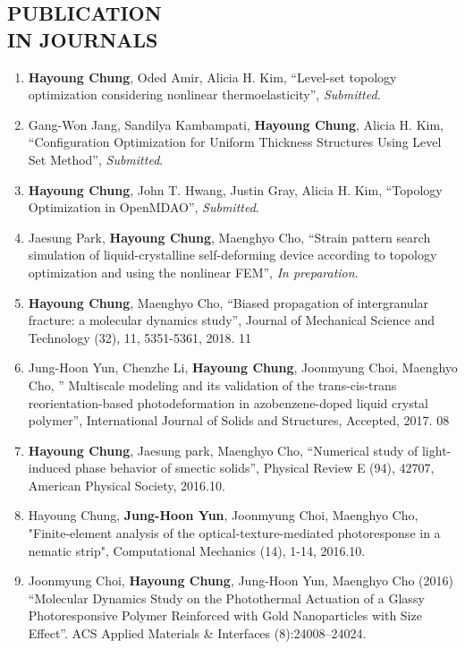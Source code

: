 \documentclass[margin, 10pt]{res} %
\begin{document}
\begin{resume}
\section{PUBLICATION \\ IN JOURNALS}

\begin{enumerate}
    \item \textbf{Hayoung Chung}, Oded Amir, Alicia H. Kim, “Level-set topology optimization considering nonlinear thermoelasticity”, \textit{Submitted}. %
    \item Gang-Won Jang, Sandilya Kambampati, \textbf{Hayoung Chung}, Alicia H. Kim, “Configuration Optimization for Uniform Thickness Structures Using Level Set Method”, \textit{Submitted}.
    \item \textbf{Hayoung Chung}, John T. Hwang, Justin Gray, Alicia H. Kim, “Topology Optimization in OpenMDAO”, \textit{Submitted}.
    \item Jaesung Park, \textbf{Hayoung Chung}, Maenghyo Cho, “Strain pattern search simulation of liquid-crystalline self-deforming device according to topology optimization and using the nonlinear FEM”, \textit{In preparation}. 
    \item \textbf{Hayoung Chung}, Maenghyo Cho, “Biased propagation of intergranular fracture: a molecular dynamics study”, Journal of Mechanical Science and Technology (32), 11, 5351-5361, 2018. 11 %
    \item Jung-Hoon Yun, Chenzhe Li, \textbf{Hayoung Chung}, Joonmyung Choi, Maenghyo Cho, ” Multiscale modeling and its validation of the trans-cis-trans reorientation-based photodeformation in azobenzene-doped liquid crystal polymer”, International Journal of Solids and Structures, Accepted, 2017. 08 %
    \item \textbf{Hayoung Chung}, Jaesung park, Maenghyo Cho, “Numerical study of light-induced phase behavior of smectic solids”, Physical Review E (94), 42707, American Physical Society, 2016.10.  %
    \item Hayoung Chung, \textbf{Jung-Hoon Yun}, Joonmyung Choi, Maenghyo Cho, "Finite-element analysis of the optical-texture-mediated photoresponse in a nematic strip", Computational Mechanics (14), 1-14, 2016.10. %
    \item Joonmyung Choi, \textbf{Hayoung Chung}, Jung-Hoon Yun, Maenghyo Cho (2016) “Molecular Dynamics Study on the Photothermal Actuation of a Glassy Photoresponsive Polymer Reinforced with Gold Nanoparticles with Size Effect”. ACS Applied Materials \& Interfaces (8):24008–24024.  %

\end{enumerate}
\end{resume}
\end{document}
